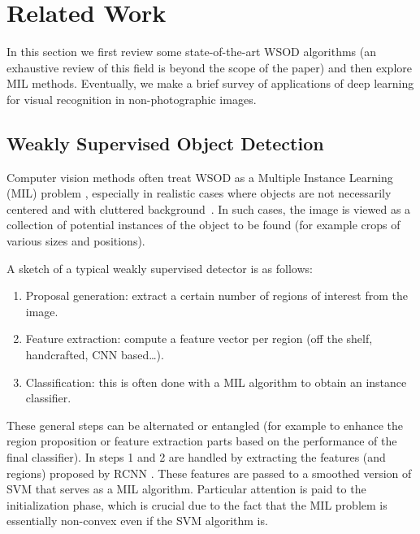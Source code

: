 \documentclass[preprint]{elsarticle}
\begin{document}
\section{Related Work}
In this section we first review some state-of-the-art WSOD algorithms (an exhaustive review of this field is beyond the scope of the paper) and then explore MIL methods. Eventually, we make a brief survey of applications of deep learning for visual recognition in non-photographic images. 


\subsection{Weakly Supervised Object Detection}
\label{sec:WSOD_relatedWork}

Computer vision methods often treat WSOD as a Multiple Instance Learning (MIL) problem \citep{dietterich_solving_1997}, especially in realistic cases where objects are not necessarily centered and with cluttered background~\citep{nguyen_weakly_2009,siva_weakly_2011,song_learning_2014,bilen_weakly_2016}.
In such cases, the image is viewed as a collection of potential instances of the object to be found (for example crops of various sizes and positions). 

A sketch of a typical weakly supervised detector is as follows:
\begin{enumerate}
\item Proposal generation: extract a certain number of regions of interest from the image. 
\item Feature extraction: compute a feature vector per region (off the shelf, handcrafted, CNN based\dots).
\item Classification: this is often done with a MIL algorithm to obtain an instance classifier.
\end{enumerate}

 These general steps can be alternated or entangled (for example to enhance the region proposition or feature extraction parts based on the performance of the final classifier).
In \citep{song_learning_2014} steps 1 and 2 are handled by extracting the features (and regions) proposed by RCNN \citep{girshick_rich_2014} . These features are passed to a smoothed version of SVM that serves as a MIL algorithm. Particular attention is paid to the initialization phase, which is crucial due to the fact that the MIL problem is essentially non-convex even if the SVM algorithm is. 
\end{document}
